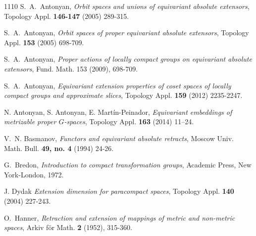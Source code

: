 \documentclass{amsart}
\begin{document}
\begin{thebibliography}{1110}
 S.~A.~Antonyan, {\em  Orbit spaces and unions of equivariant absolute extensors},  Topology Appl. {\bf 146-147} (2005) 289-315.

 S.~A.~Antonyan, {\em  Orbit spaces of proper equivariant absolute extensors},  Topology Appl. {\bf 153} (2005) 698-709.
 
 
 S.~A.~Antonyan, {\em Proper actions of locally compact groups on equivariant absolute  extensors},  Fund. Math. 153 (2009), 698-709.
 
 
  S.~A.~Antonyan, {\em Equivariant extension properties of coset spaces of locally compact groups and approximate slices}, Topology Appl. {\bf 159} (2012)  2235-2247.  
 
 
 
    N. Antonyan,  S.  Antonyan,   E.  Mart\'in-Peinador,  {\em  Equivariant embeddings of metrizable proper $G$-spaces}, Topology Appl. {\bf 163} (2014)  11--24.  
   

 
   V.~N.  Basmanov, {\em Functors and equivariant absolute retracts}, Moscow Univ. Math. Bull. {\bf 49, no. 4} (1994)   24-26.


 G.~Bredon, {\em  Introduction to compact transformation groups},
 Academic Press,  New York-London, 1972.



J. Dydak {\em Extension dimension for paracompact spaces},  Topology Appl. {\bf 140} (2004) 227-243.



 O.~Hanner, {\em  Retraction and extension of mappings of metric and non-metric spaces}, Arkiv f\" or Math. {\bf 2} (1952), 315-360.


\end{thebibliography}
\end{document}
